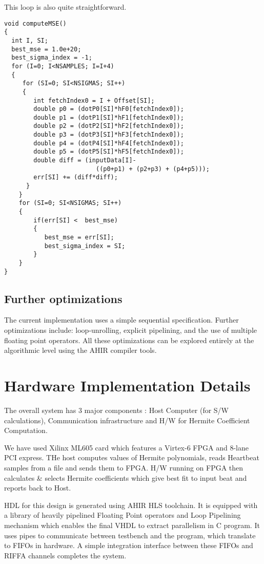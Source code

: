\documentclass[runningheads]{llncs}
\begin{document}
This loop is also quite straightforward.
\begin{verbatim}
void computeMSE()
{
  int I, SI;
  best_mse = 1.0e+20;
  best_sigma_index = -1;
  for (I=0; I<NSAMPLES; I=I+4)
  {
     for (SI=0; SI<NSIGMAS; SI++)
     {
        int fetchIndex0 = I + Offset[SI]; 
        double p0 = (dotP0[SI]*hF0[fetchIndex0]);
        double p1 = (dotP1[SI]*hF1[fetchIndex0]);
        double p2 = (dotP2[SI]*hF2[fetchIndex0]);
        double p3 = (dotP3[SI]*hF3[fetchIndex0]);
        double p4 = (dotP4[SI]*hF4[fetchIndex0]);
        double p5 = (dotP5[SI]*hF5[fetchIndex0]);
        double diff = (inputData[I]-
                         ((p0+p1) + (p2+p3) + (p4+p5)));
        err[SI] += (diff*diff);
      }
    }
    for (SI=0; SI<NSIGMAS; SI++)
    {
        if(err[SI] <  best_mse)
        {
           best_mse = err[SI];
           best_sigma_index = SI;
        }
    }
}
\end{verbatim}


\subsection{Further optimizations}

The current implementation uses a simple sequential specification.
Further optimizations include: loop-unrolling, explicit pipelining,
and the use of multiple floating point operators.  All these optimizations
can be explored entirely at the algorithmic level using the AHIR
compiler tools.

\section{Hardware Implementation Details}\label{s:results}
The overall system has 3 major components : Host Computer (for S/W calculations), 
Communication infrastructure and H/W for Hermite Coefficient Computation.


We have used Xilinx ML605 card which features a Virtex-6 FPGA and 8-lane PCI express. 
THe host computes values of Hermite polynomials, reads Heartbeat samples 
from a file and sends them to FPGA. H/W running on FPGA then calculates \& selects 
Hermite coefficients which give best fit to input beat and reports back to Host. 


HDL for this design is generated using AHIR HLS toolchain. It is equipped with a library 
of heavily pipelined Floating Point operators and Loop Pipelining mechanism which 
enables the final VHDL to extract parallelism in C program. It uses pipes to communicate 
between testbench and the program, which translate to FIFOs in hardware. A simple integration 
interface between these FIFOs and RIFFA channels completes the system. 
\end{document}
